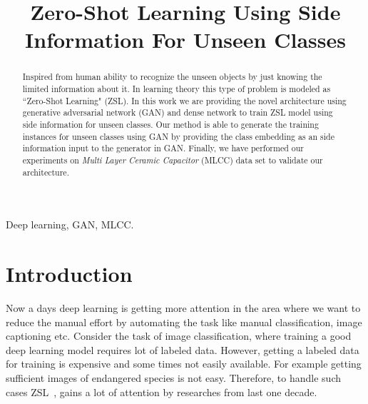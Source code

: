 \documentclass[11pt, conference, english]{IEEEtran}
\title{Zero-Shot Learning Using Side Information For Unseen Classes}
\author{
	\IEEEauthorblockN{Sanidhay Bhambay}
	\IEEEauthorblockA{Samsung Electro-Mechanics Software India Bangalore Pvt Limited\\
		\{sanidhay.bhambay\}@samsung.com}%
}
\theoremstyle{plain}
\theoremstyle{definition}
\theoremstyle{remark}
\begin{document}
{}

	\maketitle 
	\begin{abstract}
		Inspired from human ability to recognize the unseen objects by just knowing the limited information about it. In learning theory this type of problem is modeled as ``Zero-Shot Learning" (ZSL). In this work we are providing the novel architecture using generative adversarial network (GAN) and dense network to train ZSL model using side information for unseen classes. Our method is able to generate the training instances for unseen classes using GAN by providing the class embedding as an side information input to the generator in GAN. Finally, we have performed our experiments on \textit{Multi Layer Ceramic Capacitor} (MLCC) data set to validate our architecture.
		
		
		
		
		
		
		
		
	\end{abstract}
	\begin{IEEEkeywords}
		Deep learning, GAN, MLCC.
	\end{IEEEkeywords}
	\section{Introduction}
	Now a days deep learning is getting more attention in the area where we want to reduce the 
	manual effort by automating the task like manual classification, image captioning etc. Consider the task of image classification,  where training a good deep learning model requires lot of labeled data. However, getting a labeled data for training is expensive and some times not easily available. For example getting sufficient images of endangered species is not easy. Therefore, to handle such cases ZSL~\cite{palatucci2009zero}, gains a lot of attention by researches from last one decade.
	
\end{document}
